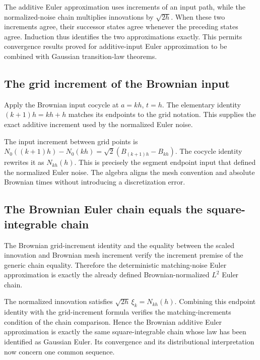 \documentclass[11pt,a4paper]{report}
\begin{document}
The additive Euler approximation uses increments of an input path, while the normalized-noise chain multiplies innovations by \(\sqrt{2h}\). When these two increments agree, their successor states agree whenever the preceding states agree. Induction thus identifies the two approximations exactly. This permits convergence results proved for additive-input Euler approximation to be combined with Gaussian transition-law theorems.

\subsection{\texorpdfstring{The grid increment of the Brownian input}{The grid increment of the Brownian input}}
\label{report-step-UnadjustedLangevin-GibbsStationarity-lean-4}


Apply the Brownian input cocycle at \(a=kh\), \(t=h\). The elementary identity \((k+1)h=kh+h\) matches its endpoints to the grid notation. This supplies the exact additive increment used by the normalized Euler noise.



The input increment between grid points is \(N_0((k+1)h)-N_0(kh)=\sqrt2(B_{(k+1)h}-B_{kh})\). The cocycle identity rewrites it as \(N_{kh}(h)\). This is precisely the segment endpoint input that defined the normalized Euler noise. The algebra aligns the mesh convention and absolute Brownian times without introducing a discretization error.

\subsection{\texorpdfstring{The Brownian Euler chain equals the square-integrable chain}{The Brownian Euler chain equals the square-integrable chain}}
\label{report-step-UnadjustedLangevin-GibbsStationarity-lean-5}


The Brownian grid-increment identity and the equality between the scaled innovation and Brownian mesh increment verify the increment premise of the generic chain equality. Therefore the deterministic matching-noise Euler approximation is exactly the already defined Brownian-normalized \(L^2\) Euler chain.



The normalized innovation satisfies \(\sqrt{2h}\,\xi_k=N_{kh}(h)\). Combining this endpoint identity with the grid-increment formula verifies the matching-increments condition of the chain comparison. Hence the Brownian additive Euler approximation is exactly the same square-integrable chain whose law has been identified as Gaussian Euler. Its convergence and its distributional interpretation now concern one common sequence.
\end{document}
